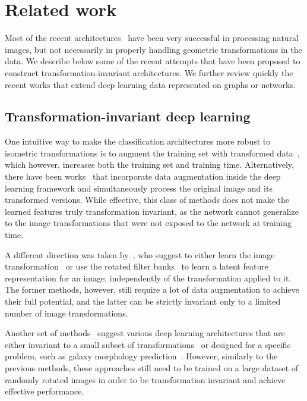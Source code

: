 \documentclass[10pt,journal,compsoc]{IEEEtran}
\begin{document}
	\section{Related work}
	\label{s:related_work}

	Most of the recent architectures~\cite{bb:lecun98gradient, bb:krizhevsky2012imagenetNIPS2012} have been very successful in processing natural images, but not necessarily in properly handling geometric transformations in the data. We describe below some of the recent attempts that have been proposed to construct transformation-invariant architectures. We further review quickly the recent works that extend deep learning data represented on graphs or networks.


	\subsection{Transformation-invariant deep learning}

	One intuitive way to make the classification architectures more robust to isometric transformations is to augment the training set with transformed data~\cite{bb:van2012art}, which however, increases both the training set and training time. Alternatively, there have been works~\cite{bb:fasel2006rotation, bb:Coors2018VISAPP, bb:dima} that incorporate data augmentation inside the deep learning framework and simultaneously process the original image and its transformed versions. While effective, this class of methods does not make the learned features truly transformation invariant, as the network cannot generalize to the image transformations that were not exposed to the network at training time.

	A different direction was taken by~\cite{bb:STN, bb:dai2018, bb:marcos2016learning}, who suggest to either learn the image transformation~\cite{bb:STN, bb:dai2018} or use the rotated filter banks~\cite{bb:marcos2016learning} to learn a latent feature representation for an image, independently of the transformation applied to it. The former methods, however, still require a lot of data augmentation to achieve their full potential, and the latter can be strictly invariant only to a limited number of image transformations.


	Another set of methods~\cite{bb:cohen2016group, bb:dieleman2015rotation, bb:dieleman-cyclic-2016} suggest various deep learning architectures that are either invariant to a small subset of transformations~\cite{bb:cohen2016group, bb:dieleman-cyclic-2016} or designed for a specific problem, such as galaxy morphology prediction~\cite{bb:dieleman2015rotation}. However, similarly to the previous methods, these approaches still need to be trained on a large dataset of randomly rotated images in order to be transformation invariant and achieve effective performance.
\end{document}

